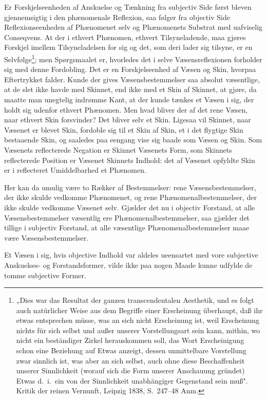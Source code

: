 \documentclass[12pt]{book}
\newcommand{\opage}[1]{\marginnote{\footnotesize\textit{[#1]}}}
\begin{document}
Er Forskjelseenheden af Anskuelse og Tænkning fra subjectiv Side først bleven
gjennemsigtig i den phænomenale Reflexion, saa følger fra objectiv Side
Reflexionseenheden af Phænomenet selv og Phænomenets Substrat med uafviselig
Conseqvens. At der i ethvert Phænomen, ethvert Tilsyneladende, maa gjøres Forskjel
imellem Tilsyneladelsen for sig og det, som deri lader sig tilsyne, er en
Selvfølge\footnote{„Dies war das Resultat der ganzen transcendentalen Aesthetik, und
es folgt auch natürlicher Weise aus dem Begriffe einer Erscheinung überhaupt, daß
ihr etwas entsprechen müsse, was an sich nicht Erscheinung ist, weil Erscheinung
nichts für sich selbst und außer unserer Vorstellungsart sein kann, mithin, wo nicht
ein beständiger Zirkel herauskommen soll, das Wort Erscheinigung schon eine Beziehung
auf Etwas anzeigt, dessen unmittelbare Vorstellung zwar sinnlich ist, was aber an
sich selbst, auch ohne diese Beschaffenheit unserer Sinnlichkeit (worauf sich die
Form unserer Anschauung gründet) Etwas d.\ i.\ ein von der Sinnlichkeit unabhängiger
Gegenstand sein muß". Kritik der reinen Vernunft, Leipzig 1838, S.~247--48 Anm.}; men
\opage{79} Spørgsmaalet er, hvorledes det i selve Væsensreflexionen forholder sig med denne
Fordobling. Det er en Forskjelseenhed af Væsen og Skin, hvorpaa Eftertrykket falder.
Kunde der gives Væsensbestemmelser saa absolut væsentlige, at de slet ikke havde med
Skinnet, end ikke med et Skin af Skinnet, at gjøre, da maatte man unegtelig indrømme
Kant, at der kunde tænkes et Væsen i sig, der holdt sig udenfor ethvert Phænomen. Men
hvad bliver der af det rene Væsen, naar ethvert Skin forsvinder? Det bliver selv et
Skin. Ligesaa vil Skinnet, naar Væsenet er blevet Skin, fordoble sig til et Skin af
Skin, et i det flygtige Skin bestaaende Skin, og saaledes paa eengang vise sig baade
som Væsen og Skin. Som Væsenets reflecterede Negation er Skinnet Væsenets Form, som
Skinnets reflecterede Position er Væsenet Skinnets Indhold: det af Væsenet opfyldte
Skin er i reflecteret Umiddelbarhed et Phænomen.

Her kan da umulig være to Rækker af Bestemmelser: rene Væsensbestemmelser, der ikke
skulde vedkomme Phænomenet, og rene Phænomenalbestemmelser, der ikke skulde vedkomme
Væsenet selv. Gjælder det nu i objectiv Forstand, at alle Væsensbestemmelser
væsentlig ere Phænomenalbestemmelser, saa gjælder det tillige i subjectiv Forstand,
at alle væsentlige Phænomenalbestemmelser maae være Væsensbestemmelser.

Et Væsen i sig, hvis objective Indhold var aldeles ueensartet med vore subjective
\opage{80} Anskuelses- og Forstandsformer, vilde ikke paa nogen Maade kunne udfylde de tomme
subjective Former.
\end{document}

